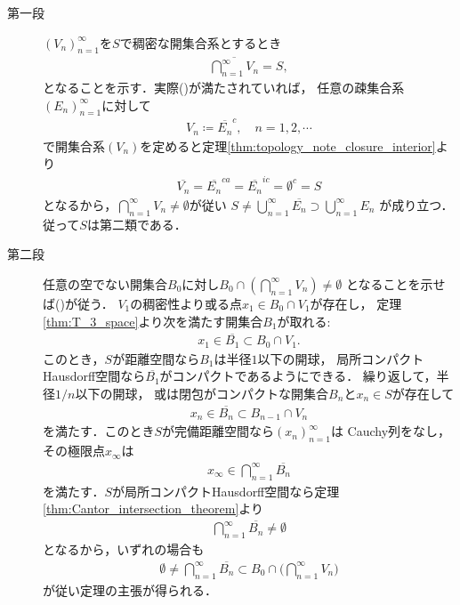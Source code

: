 	\begin{prf}\mbox{}
		\begin{description}
			\item[第一段]
				$(V_n)_{n=1}^\infty$を$S$で稠密な開集合系とするとき
				\begin{align}
					\overline{\bigcap_{n=1}^\infty V_n} = S,
					\label{eq:thm_Baire_category_theorem_1}
				\end{align}
				となることを示す．実際()が満たされていれば，
				任意の疎集合系$(E_n)_{n=1}^\infty$に対して
				\begin{align}
					V_n \coloneqq \overline{E_n}^c,
					\quad n=1,2,\cdots
				\end{align}
				で開集合系$(V_n)$を定めると定理\ref{thm:topology_note_closure_interior}より
				\begin{align}
					\overline{V_n} = \overline{E_n}^{ca} = \overline{E_n}^{ic} = \emptyset^c = S
				\end{align}
				となるから，$\bigcap_{n=1}^\infty V_n \neq \emptyset$が従い
				$S \neq \bigcup_{n=1}^\infty \overline{E_n} \supset \bigcup_{n=1}^\infty E_n$
				が成り立つ．従って$S$は第二類である．
				
			\item[第二段]
				任意の空でない開集合$B_0$に対し$B_0 \cap \left( \bigcap_{n=1}^\infty V_n \right) \neq \emptyset$
				となることを示せば()が従う．
				$V_1$の稠密性より或る点$x_1 \in B_0 \cap V_1$が存在し，
				定理\ref{thm:T_3_space}より次を満たす開集合$B_1$が取れる:
				\begin{align}
					x_1 \in \overline{B_1} \subset B_0 \cap V_1.
					\label{eq:thm_Baire_category_theorem_2}
				\end{align}
				このとき，$S$が距離空間なら$B_1$は半径$1$以下の開球，
				局所コンパクトHausdorff空間なら$\overline{B_1}$がコンパクトであるようにできる．
				繰り返して，半径$1/n$以下の開球，
				或は閉包がコンパクトな開集合$B_n$と$x_n \in S$が存在して
				\begin{align}
					x_n \in \overline{B_n} \subset B_{n-1} \cap V_n
				\end{align}
				を満たす．このとき$S$が完備距離空間なら$(x_n)_{n=1}^\infty$は
				Cauchy列をなし，その極限点$x_\infty$は
				\begin{align}
					x_\infty \in \bigcap_{n=1}^\infty \overline{B_n}
				\end{align}
				を満たす．$S$が局所コンパクトHausdorff空間なら定理\ref{thm:Cantor_intersection_theorem}より
				\begin{align}
					\bigcap_{n=1}^\infty \overline{B_n} \neq \emptyset
				\end{align}
				となるから，いずれの場合も
				\begin{align}
					\emptyset \neq \bigcap_{n=1}^\infty \overline{B_n} 
					\subset B_0 \cap \Biggl( \bigcap_{n=1}^\infty V_n \Biggr)
				\end{align}
				が従い定理の主張が得られる．
				\QED
		\end{description}
	\end{prf}
	
